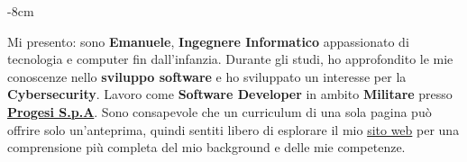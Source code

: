 \documentclass[10pt,a4paper]{altacv}
\begin{document}







\begin{adjustwidth}{}{-8cm}
\makecvheader
\end{adjustwidth}

Mi presento: sono \textbf{Emanuele}, \textbf{Ingegnere Informatico} appassionato di tecnologia e computer fin dall'infanzia. Durante gli studi, ho approfondito le mie conoscenze nello \textbf{sviluppo software} e ho sviluppato un interesse per la \textbf{Cybersecurity}. Lavoro come \textbf{Software Developer} in ambito \textbf{Militare} presso \href{https://www.progesi.eu/}{\textbf{Progesi S.p.A}}. Sono consapevole che un curriculum di una sola pagina può offrire solo un'anteprima, quindi sentiti libero di esplorare il mio \href{https://emanueleseminara.it/}{sito web} per una comprensione più completa del mio background e delle mie competenze.


\end{document}
